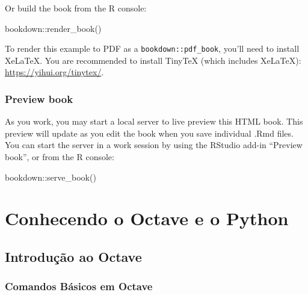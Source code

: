 \documentclass[
]{book}
\newenvironment{Shaded}{\begin{snugshade}}{\end{snugshade}}
\newcommand{\FunctionTok}[1]{\textcolor[rgb]{0.00,0.00,0.00}{#1}}
\newcommand{\NormalTok}[1]{#1}
\newcommand{\SpecialCharTok}[1]{\textcolor[rgb]{0.00,0.00,0.00}{#1}}
\begin{document}
Or build the book from the R console:

\begin{Shaded}
\begin{Highlighting}[]
\NormalTok{bookdown}\SpecialCharTok{::}\FunctionTok{render\_book}\NormalTok{()}
\end{Highlighting}
\end{Shaded}

To render this example to PDF as a \texttt{bookdown::pdf\_book}, you'll need to install XeLaTeX. You are recommended to install TinyTeX (which includes XeLaTeX): \url{https://yihui.org/tinytex/}.

\hypertarget{preview-book}{%
\section*{Preview book}\label{preview-book}}

As you work, you may start a local server to live preview this HTML book. This preview will update as you edit the book when you save individual .Rmd files. You can start the server in a work session by using the RStudio add-in ``Preview book'', or from the R console:

\begin{Shaded}
\begin{Highlighting}[]
\NormalTok{bookdown}\SpecialCharTok{::}\FunctionTok{serve\_book}\NormalTok{()}
\end{Highlighting}
\end{Shaded}

\hypertarget{part-conhecendo-o-octave-e-o-python}{%
\part{Conhecendo o Octave e o Python}\label{part-conhecendo-o-octave-e-o-python}}

\hypertarget{introduuxe7uxe3o-ao-octave}{%
\chapter{Introdução ao Octave}\label{introduuxe7uxe3o-ao-octave}}

\hypertarget{comandos-buxe1sicos-em-octave}{%
\section{Comandos Básicos em Octave}\label{comandos-buxe1sicos-em-octave}}
\end{document}
